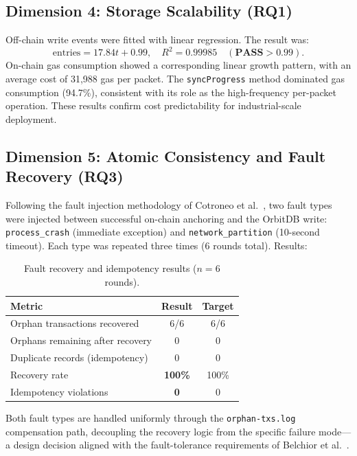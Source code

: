 \documentclass[10pt,twocolumn]{article}
\begin{document}
\subsection{Dimension 4: Storage Scalability (RQ1)}

Off-chain write events were fitted with linear regression. The result was:
\[
  \text{entries} = 17.84t + 0.99, \quad R^2 = 0.99985 \quad (\textbf{PASS} > 0.99).
\]
On-chain gas consumption showed a corresponding linear growth pattern, with an
average cost of 31,988 gas per packet. The \texttt{syncProgress} method dominated
gas consumption (94.7\%), consistent with its role as the high-frequency per-packet
operation. These results confirm cost predictability for industrial-scale deployment.

\subsection{Dimension 5: Atomic Consistency and Fault Recovery (RQ3)}

Following the fault injection methodology of Cotroneo et al.~\cite{cotroneo2022}, two
fault types were injected between successful on-chain anchoring and the OrbitDB write:
\texttt{process\_crash} (immediate exception) and \texttt{network\_partition} (10-second
timeout). Each type was repeated three times (6 rounds total). Results:

\begin{table}[ht]
  \centering
  \caption{Fault recovery and idempotency results ($n=6$ rounds).}
  \label{tab:fault}
  \small
  \begin{tabular}{lcc}
    \toprule
    Metric & Result & Target \\
    \midrule
    Orphan transactions recovered  & 6/6 & 6/6 \\
    Orphans remaining after recovery & 0 & 0 \\
    Duplicate records (idempotency) & 0 & 0 \\
    \midrule
    Recovery rate & \textbf{100\%} & 100\% \\
    Idempotency violations & \textbf{0} & 0 \\
    \bottomrule
  \end{tabular}
\end{table}

Both fault types are handled uniformly through the \texttt{orphan-txs.log} compensation
path, decoupling the recovery logic from the specific failure mode---a design decision
aligned with the fault-tolerance requirements of Belchior et al.~\cite{belchior2022}.
\end{document}
